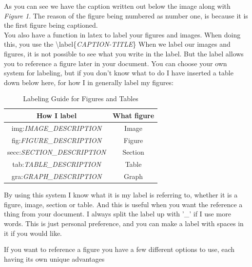 \documentclass{article}
\newcommand{\jbs}[1]{\textbackslash{}#1} %
\begin{document}
As you can see we have the caption written out below the image along with \textit{Figure 1}.
The reason of the figure being numbered as number one, is because it is the first figure being captioned. \\

You also have a function in latex to label your figures and images. When doing this, you use the \jbs{label\{\textit{CAPTION-TITLE}\}}
When we label our images and figures, it is not possible to see what you write in the label.
But the label allows you to reference a figure later in your document. You can choose your own system for labeling, but if you don't know what to do I have inserted
a table down below here, for how I in generally label my figures: \\

\begin{table}[h]
    \centering
    \begin{tabular}{|c|c|}
        \hline
        \rowcolor{gray!30}
        How I label & What figure \\ 
        \hline
        img:\textit{IMAGE\_DESCRIPTION} & Image \\ 
        \hline
        fig:\textit{FIGURE\_DESCRIPTION} & Figure \\ 
        \hline
        secc:\textit{SECTION\_DESCRIPTION} & Section \\ 
        \hline
        tab:\textit{TABLE\_DESCRIPTION} & Table \\ 
        \hline
        gra:\textit{GRAPH\_DESCRIPTION} & Graph \\ 
        \hline
    \end{tabular}
    \caption{Labeling Guide for Figures and Tables}
    \label{tab:caption_labels}
\end{table}


By using this system I know what it is my label is referring to, whether it is a figure, image, section or table. And this is useful 
when you want the reference a thing from your document. I always split the label up with '\_' if I use more words. This is just personal preference, and you can make a
label with spaces in it if you would like.

If you want to reference a figure you have a few different options to use, each having its own unique advantages
\end{document}
